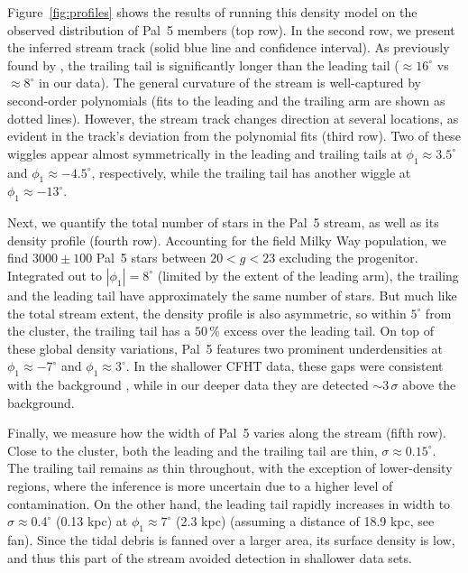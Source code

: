 \documentclass[twocolumn]{aastex62}
\begin{document}
Figure~\ref{fig:profiles} shows the results of running this density model on the observed distribution of Pal~5 members (top row).
In the second row, we present the inferred stream track (solid blue line and confidence interval).
As previously found by \citet{Bernard:2016}, the trailing tail is significantly longer than the leading tail ($\approx16^\circ$ vs $\approx8^\circ$ in our data).
The general curvature of the stream is well-captured by second-order polynomials (fits to the leading and the trailing arm are shown as dotted lines).
However, the stream track changes direction at several locations, as evident in the track's deviation from the polynomial fits (third row).
Two of these wiggles appear almost symmetrically in the leading and trailing tails at $\phi_1\approx3.5^\circ$ and $\phi_1\approx-4.5^\circ$, respectively, while the trailing tail has another wiggle at $\phi_1\approx-13^\circ$.

Next, we quantify the total number of stars in the Pal~5 stream, as well as its density profile (fourth row).
Accounting for the field Milky Way population, we find $3000\pm100$ Pal~5 stars between $20<g<23$ excluding the progenitor.
Integrated out to $|\phi_1|=8^\circ$ (limited by the extent of the leading arm), the trailing and the leading tail have approximately the same number of stars.
But much like the total stream extent, the density profile is also asymmetric, so within $5^\circ$ from the cluster, the trailing tail has a $50\,\%$ excess over the leading tail.
On top of these global density variations, Pal~5 features two prominent underdensities at $\phi_1\approx-7^\circ$ and $\phi_1\approx3^\circ$.
In the shallower CFHT data, these gaps were consistent with the background \citep{Erkal:2016}, while in our deeper data they are detected $\sim3\,\sigma$ above the background.

Finally, we measure how the width of Pal~5 varies along the stream (fifth row).
Close to the cluster, both the leading and the trailing tail are thin, $\sigma\approx0.15^\circ$.
The trailing tail remains as thin throughout, with the exception of lower-density regions, where the inference is more uncertain due to a higher level of contamination.
On the other hand, the leading tail rapidly increases in width to $\sigma\approx0.4^\circ$ (0.13 kpc) at $\phi_1\approx7^\circ$ (2.3 kpc) (assuming a distance of 18.9 kpc, see fan).
Since the tidal debris is fanned over a larger area, its surface density is low, and thus this part of the stream avoided detection in shallower data sets.
\end{document}
